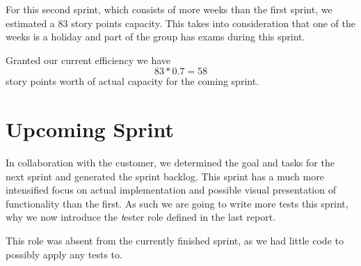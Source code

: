 \documentclass[a4paper]{article}
\begin{document}
For this second sprint, which consists of more weeks than the first sprint, we
estimated a $83$ story points capacity. This takes into consideration that one
of the weeks is a holiday and part of the group has exams during this sprint.

Granted our current efficiency we have
$$83*0.7 = 58$$
story points worth of actual capacity for the coming sprint.

\section{Upcoming Sprint}
In collaboration with the customer, we determined the goal and tasks for the
next sprint and generated the sprint backlog. This sprint has a much more
intensified focus on actual implementation and possible visual presentation of
functionality than the first. As such we are going to write more tests this
sprint, why we now introduce the {\textit tester} role defined in the last
report.

This role was absent from the currently finished sprint, as we had little code
to possibly apply any tests to.
\end{document}
